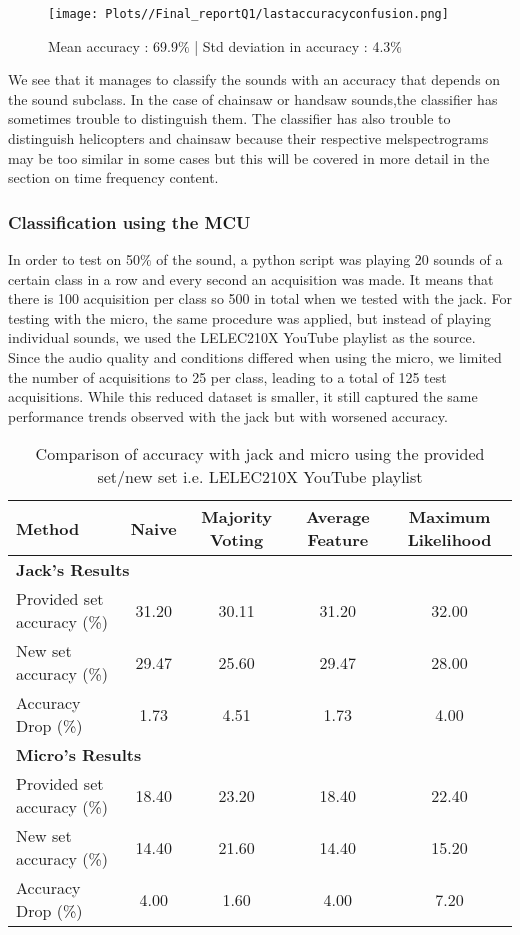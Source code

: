 \documentclass{article}
\begin{document}
\begin{figure}[h]
    \centering
    \texttt{[image: Plots//Final\_reportQ1/lastaccuracyconfusion.png]}
    \caption{Mean accuracy : 69.9$\%$ |
Std deviation in accuracy : 4.3$\%$}
\end{figure}

We see that it manages to classify the sounds with an accuracy that depends on the sound subclass. In the case of chainsaw or handsaw sounds,the classifier has sometimes trouble to distinguish them. The classifier has also trouble to distinguish helicopters and chainsaw because their respective melspectrograms may be too similar in some cases but this will be covered in more detail in the section on time frequency content.

\subsubsection{Classification using the MCU}
In order to test on 50$\%$ of the sound, a python script was playing 20 sounds of a certain class in a row and every second an acquisition was made. It means that there is 100 acquisition per class so 500 in total when we tested with the jack. For testing with the micro, the same procedure was applied, but instead of playing individual sounds, we used the LELEC210X YouTube playlist as the source. Since the audio quality and conditions differed when using the micro, we limited the number of acquisitions to 25 per class, leading to a total of 125 test acquisitions. While this reduced dataset is smaller, it still captured the same performance trends observed with the jack but with worsened accuracy.
\begin{table}[h!]
    \centering
    \begin{tabular}{lcccc}
        \toprule
        \textbf{Method} & \textbf{Naive} & \textbf{Majority Voting} & \textbf{Average Feature} & \textbf{Maximum Likelihood} \\
        \midrule
        \multicolumn{5}{l}{\textbf{Jack's Results} } \\
        Provided set accuracy (\%)     & 31.20 & 30.11 & 31.20 & 32.00 \\
        New set accuracy (\%)         & 29.47 & 25.60 & 29.47 & 28.00 \\
        Accuracy Drop (\%)            & 1.73  & 4.51  & 1.73  & 4.00 \\
        \midrule
        \multicolumn{5}{l}{\textbf{Micro's Results}} \\
        Provided set accuracy (\%)     & 18.40 & 23.20 & 18.40 & 22.40 \\
        New set accuracy (\%)         & 14.40 & 21.60 & 14.40 & 15.20 \\
        Accuracy Drop (\%)            & 4.00  & 1.60  & 4.00  & 7.20 \\
        \bottomrule
    \end{tabular}
    \caption{Comparison of accuracy with jack and micro using the provided set/new set i.e. LELEC210X YouTube playlist}
    \label{tab:jack_mic_comparison}
\end{table}
\end{document}
